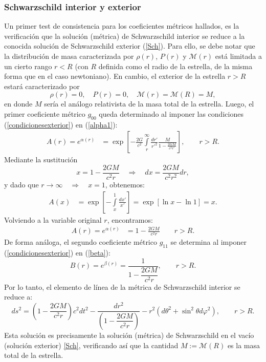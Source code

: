 \subsubsection{Schwarzschild interior y exterior}\label{sec:interiorexterior}
Un primer test de consistencia para los coeficientes métricos hallados, es la verificación que la solución (métrica) de Schwarzschild interior se reduce a la conocida solución de Schwarzschild exterior (\ref{Sch}). Para ello, se debe notar que la distribución de masa caracterizada por $\rho(r)$, $P(r)$ y $\mathcal{M}(r)$ está limitada a un cierto rango $r<R$ (con $R$ definida como el radio de la estrella, de la misma forma que en el caso newtoniano). En cambio, el exterior de la estrella $r>R$ estará caracterizado por
\begin{equation}\label{condicionesexterior}
 \rho(r)=0,\quad P(r)=0,\quad \mathcal{M}(r)=\mathcal{M}(R)=M,
\end{equation}
en donde $M$ sería el análogo relativista de la masa total de la estrella.
Luego, el primer coeficiente métrico $g_{00}$ queda determinado al imponer las condiciones (\ref{condicionesexterior}) en (\ref{alpha1}):
\begin{align}\label{Arext1}
A(r)=e^{\alpha(r)}&=\exp{\left[-\frac{2G}{c^2}\int\limits_r^{\infty}\frac{dr'}{r'^2}\frac{M}{1-\frac{2GM}{c^2r'}}\right]},\qquad r>R.
\end{align}
Mediante la sustitución
\begin{equation}
x=1-\frac{2GM}{c^2r}\quad\Rightarrow\quad dx=\frac{2GM}{c^2r^2}dr,
\end{equation}
y dado que $r\to\infty\quad\Rightarrow\quad x=1$, obtenemos:
\begin{align}
A(x)&=\exp\left[-\int\limits_{x}^{1}\frac{dx'}{x'}\right]=\exp\left[\ln x-\ln 1\right]=x.
\end{align}
Volviendo a la variable original $r$, encontramos:
\begin{align} \label{Arext2}
A(r) =e^{\alpha(r)}&= 1-\frac{2GM}{c^2r}\qquad
\text{$r>R$}.
\end{align}
De forma análoga, el segundo coeficiente métrico $g_{11}$ se determina al imponer (\ref{condicionesexterior}) en (\ref{beta}):
\begin{equation}
 B(r)=e^{\beta(r)}=\dfrac{1}{1-\dfrac{2GM}{c^2r}},\qquad
\text{$r>R$}.
\end{equation}
Por lo tanto, el elemento de línea de la métrica de Schwarzschild interior se reduce a:
\begin{equation}
 ds^2=\left(1-\dfrac{2GM}{c^2r}\right)c^2dt^2-\dfrac{dr^2}{\left(1-\dfrac{2GM}{c^2r}\right)}-r^2(d\theta^2+\sin^2\theta d\varphi^2),\qquad
\text{$r>R$}.
\end{equation}
Esta solución es precisamente la solución (métrica) de Schwarzschild en el vacío (solución exterior) \eqref{Sch}, verificando así que la cantidad $M:=\mathcal{M}(R)$ es la masa total de la estrella.


